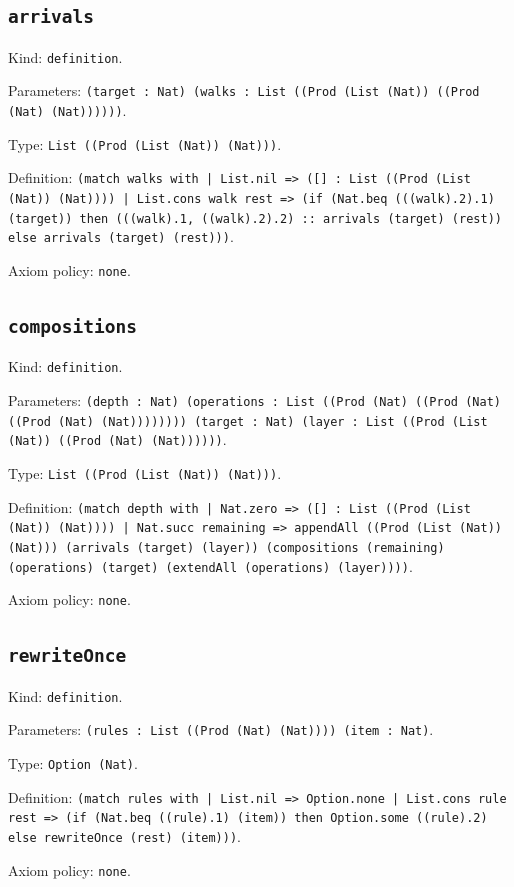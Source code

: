 \documentclass[11pt]{article}
\begin{document}
\subsection*{\texttt{arrivals}}
\noindent Kind: \texttt{definition}.\par
\noindent Parameters: \texttt{(target : Nat) (walks : List ((Prod (List (Nat)) ((Prod (Nat) (Nat))))))}.\par
\noindent Type: \texttt{List ((Prod (List (Nat)) (Nat)))}.\par
\noindent Definition: \texttt{(match walks with | List.nil => ([] : List ((Prod (List (Nat)) (Nat)))) | List.cons walk rest => (if (Nat.beq (((walk).2).1) (target)) then (((walk).1, ((walk).2).2) :: arrivals (target) (rest)) else arrivals (target) (rest)))}.\par
\noindent Axiom policy: \texttt{none}.\par
\subsection*{\texttt{compositions}}
\noindent Kind: \texttt{definition}.\par
\noindent Parameters: \texttt{(depth : Nat) (operations : List ((Prod (Nat) ((Prod (Nat) ((Prod (Nat) (Nat)))))))) (target : Nat) (layer : List ((Prod (List (Nat)) ((Prod (Nat) (Nat))))))}.\par
\noindent Type: \texttt{List ((Prod (List (Nat)) (Nat)))}.\par
\noindent Definition: \texttt{(match depth with | Nat.zero => ([] : List ((Prod (List (Nat)) (Nat)))) | Nat.succ remaining => appendAll ((Prod (List (Nat)) (Nat))) (arrivals (target) (layer)) (compositions (remaining) (operations) (target) (extendAll (operations) (layer))))}.\par
\noindent Axiom policy: \texttt{none}.\par
\subsection*{\texttt{rewriteOnce}}
\noindent Kind: \texttt{definition}.\par
\noindent Parameters: \texttt{(rules : List ((Prod (Nat) (Nat)))) (item : Nat)}.\par
\noindent Type: \texttt{Option (Nat)}.\par
\noindent Definition: \texttt{(match rules with | List.nil => Option.none | List.cons rule rest => (if (Nat.beq ((rule).1) (item)) then Option.some ((rule).2) else rewriteOnce (rest) (item)))}.\par
\noindent Axiom policy: \texttt{none}.\par
\end{document}
